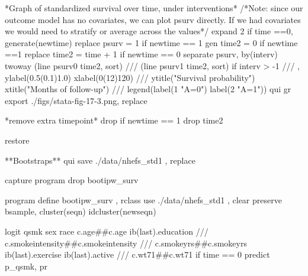 \documentclass[
  10pt,
  a4paper,
]{book}
\newenvironment{Shaded}{\begin{snugshade}}{\end{snugshade}}
\newcommand{\BaseNTok}[1]{\textcolor[rgb]{0.68,0.00,0.00}{#1}}
\newcommand{\CommentTok}[1]{\textcolor[rgb]{0.37,0.37,0.37}{#1}}
\newcommand{\FunctionTok}[1]{\textcolor[rgb]{0.28,0.35,0.67}{#1}}
\newcommand{\KeywordTok}[1]{\textcolor[rgb]{0.00,0.46,0.62}{#1}}
\newcommand{\NormalTok}[1]{\textcolor[rgb]{0.00,0.46,0.62}{#1}}
\newcommand{\StringTok}[1]{\textcolor[rgb]{0.13,0.47,0.30}{#1}}
\begin{document}
\begin{Shaded}
\begin{Highlighting}[]
\NormalTok{*Graph }\KeywordTok{of}\NormalTok{ standardized survival }\BaseNTok{over}\NormalTok{ time, under interventions*}
\CommentTok{/*Note: since our outcome model has no covariates, }
\CommentTok{we can plot psurv directly. }
\CommentTok{If we had covariates we would need to stratify or average across the values*/}
\NormalTok{expand 2 }\KeywordTok{if}\NormalTok{ time ==0, }\KeywordTok{generate}\NormalTok{(newtime)}
\KeywordTok{replace}\NormalTok{ psurv  = 1 }\KeywordTok{if}\NormalTok{ newtime == 1}
\KeywordTok{gen}\NormalTok{ time2 = 0 }\KeywordTok{if}\NormalTok{ newtime ==1}
\KeywordTok{replace}\NormalTok{ time2 = time + 1 }\KeywordTok{if}\NormalTok{ newtime == 0}
\KeywordTok{separate}\NormalTok{ psurv, }\KeywordTok{by}\NormalTok{(interv) }
\KeywordTok{twoway}\NormalTok{ (}\KeywordTok{line}\NormalTok{ psurv0 time2, }\KeywordTok{sort}\NormalTok{) }\CommentTok{///}
\NormalTok{  (}\KeywordTok{line}\NormalTok{ psurv1 time2, }\KeywordTok{sort}\NormalTok{) }\KeywordTok{if}\NormalTok{ interv \textgreater{} {-}1 }\CommentTok{///}
\NormalTok{  , }\KeywordTok{ylabel}\NormalTok{(0.5(0.1)1.0) }\KeywordTok{xlabel}\NormalTok{(0(12)120) }\CommentTok{///}
  \BaseNTok{ytitle}\NormalTok{(}\StringTok{"Survival probability"}\NormalTok{) }\BaseNTok{xtitle}\NormalTok{(}\StringTok{"Months of follow{-}up"}\NormalTok{) }\CommentTok{///}
  \BaseNTok{legend}\NormalTok{(}\KeywordTok{label}\NormalTok{(1 }\StringTok{"A=0"}\NormalTok{) }\KeywordTok{label}\NormalTok{(2 }\StringTok{"A=1"}\NormalTok{))}
\KeywordTok{qui} \KeywordTok{gr} \KeywordTok{export}\NormalTok{ ./figs/stata{-}fig{-}17{-}3.png, }\KeywordTok{replace}

\NormalTok{*remove extra timepoint*}
\KeywordTok{drop} \KeywordTok{if}\NormalTok{ newtime == 1}
\KeywordTok{drop}\NormalTok{ time2}

\KeywordTok{restore}

\NormalTok{**Bootstraps**}
\KeywordTok{qui} \KeywordTok{save}\NormalTok{ ./}\KeywordTok{data}\NormalTok{/nhefs\_std1 , }\KeywordTok{replace}
 
\KeywordTok{capture} \KeywordTok{program} \KeywordTok{drop}\NormalTok{ bootipw\_surv }

\KeywordTok{program} \KeywordTok{define}\NormalTok{ bootipw\_surv , rclass}
\KeywordTok{use}\NormalTok{ ./}\KeywordTok{data}\NormalTok{/nhefs\_std1 , }\KeywordTok{clear}
\KeywordTok{preserve}
\KeywordTok{bsample}\NormalTok{, }\KeywordTok{cluster}\NormalTok{(seqn) idcluster(newseqn)   }
        
\KeywordTok{logit}\NormalTok{ qsmk sex race c.age\#\#c.age ib(}\FunctionTok{last}\NormalTok{).education }\CommentTok{///}
\NormalTok{  c.smokeintensity\#\#c.smokeintensity }\CommentTok{///}
\NormalTok{    c.smokeyrs\#\#c.smokeyrs ib(}\FunctionTok{last}\NormalTok{).exercise ib(}\FunctionTok{last}\NormalTok{).active }\CommentTok{///}
\NormalTok{    c.wt71\#\#c.wt71 }\KeywordTok{if}\NormalTok{ time == 0}
\KeywordTok{predict}\NormalTok{ p\_qsmk, pr}


\end{Highlighting}
\end{Shaded}
\end{document}
